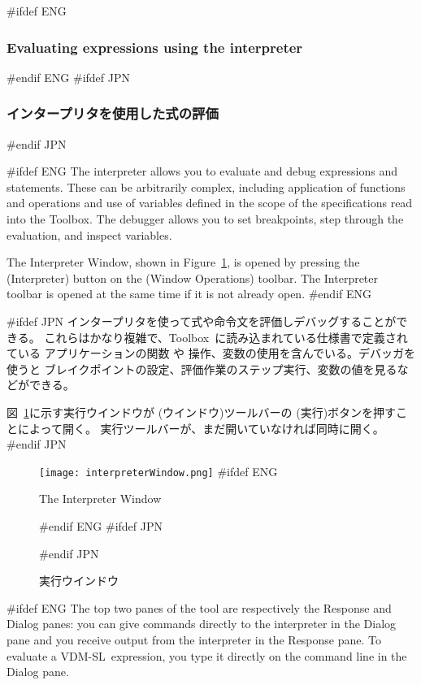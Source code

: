 \documentclass[\pformat,12pt]{article}
\newcommand{\vdmslpp}{VDM-SL}
\newcommand{\Toolbox}{Toolbox}
\newcommand{\vdmslpp}{VDM++}
\newcommand{\Toolbox}{Toolbox}
\newcommand{\guicmd}[1]{{\sf #1}}
\newcommand{\guicmd}[1]{{\gt #1}}
\begin{document}
#ifdef ENG
\subsubsection{Evaluating expressions using the interpreter}
\label{interpreter}
#endif ENG
#ifdef JPN
\subsubsection{インタープリタを使用した式の評価}
\label{interpreter}
#endif JPN

#ifdef ENG
The interpreter allows you to evaluate and debug expressions and
statements.  These can be arbitrarily complex, including application
of functions and operations and use of variables defined in the scope
of the specifications read into the \Toolbox.  The debugger allows you
to set breakpoints, step through the evaluation, and inspect variables.

The \guicmd{Interpreter Window}, shown in
Figure~\ref{fig:interpwin}, is opened by pressing the 
(\guicmd{Interpreter}) button on the (\guicmd{Window Operations})
toolbar. The \guicmd{Interpreter} toolbar is opened at the same
time if it is not already open.
#endif ENG

#ifdef JPN
インタープリタを使って式や命令文を評価しデバッグすることができる。
これらはかなり複雑で、\Toolbox\ に読み込まれている仕様書で定義されている
アプリケーションの関数 や 操作、変数の使用を含んでいる。デバッガを使うと
ブレイクポイントの設定、評価作業のステップ実行、変数の値を見るなどができる。

図~\ref{fig:interpwin}に示す\guicmd{実行ウインドウ}が
(\guicmd{ウインドウ})ツールバーの  
(\guicmd{実行})ボタンを押すことによって開く。
\guicmd{実行}ツールバーが、まだ開いていなければ同時に開く。
#endif JPN


\begin{figure}[tbh]
\begin{center}
\texttt{[image: interpreterWindow.png]}
#ifdef ENG
\caption{The Interpreter Window}
#endif ENG
#ifdef JPN
\caption{実行ウインドウ}
#endif JPN
\label{fig:interpwin}
\end{center}
\end{figure}

#ifdef ENG
The top two panes of the tool are respectively the
\guicmd{Response} and \guicmd{Dialog} panes: you
can give commands directly to the interpreter in the
\guicmd{Dialog} pane and you receive output from the
interpreter in the \guicmd{Response} pane. To evaluate a \vdmslpp\
expression, you type it directly on the command line in the
\guicmd{Dialog} pane.
\end{document}
